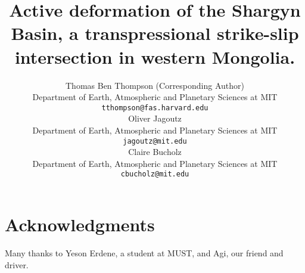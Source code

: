 \documentclass[12pt]{article}
\begin{document}
\title{Active deformation of the Shargyn Basin, a transpressional strike-slip intersection in western Mongolia.}
\author{%
    Thomas Ben Thompson (Corresponding Author)\\
    Department of Earth, Atmospheric and Planetary Sciences at MIT\\
    \texttt{tthompson@fas.harvard.edu}\vspace{40pt} \\
    Oliver Jagoutz \\
    Department of Earth, Atmospheric and Planetary Sciences at MIT \\
    \texttt{jagoutz@mit.edu} \vspace{40pt} \\
    Claire Bucholz \\ 
    Department of Earth, Atmospheric and Planetary Sciences at MIT \\
    \texttt{cbucholz@mit.edu} \\
    }
\maketitle




\tableofcontents
\listoffigures
\clearpage





\appendix

\section*{Acknowledgments}
Many thanks to Yeson Erdene, a student at MUST, and Agi, our friend and driver. 


\end{document}
